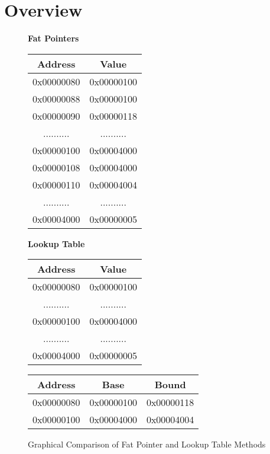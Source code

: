\section{Overview}

\begin{figure}[h]
    \begin{minipage}[t]{0.40\linewidth}
        \centering
        \textbf{Fat Pointers}
        \begin{tabular}{|c|c|}
            \hline \textbf{Address} & \textbf{Value} \\
            \hline 0x00000080 & 0x00000100 \\
            \hline 0x00000088 & 0x00000100 \\
            \hline 0x00000090 & 0x00000118 \\
            \hline .......... & .......... \\
            \hline 0x00000100 & 0x00004000 \\
            \hline 0x00000108 & 0x00004000 \\
            \hline 0x00000110 & 0x00004004 \\
            \hline .......... & .......... \\
            \hline 0x00004000 & 0x00000005 \\
            \hline
        \end{tabular}
    \end{minipage}
    \hspace{0.2cm}
    \begin{minipage}[t]{0.50\linewidth}
        \centering
        \textbf{Lookup Table}
        \begin{tabular}{|c|c|}
            \hline \textbf{Address} & \textbf{Value} \\
            \hline 0x00000080 & 0x00000100 \\
            \hline .......... & .......... \\
            \hline 0x00000100 & 0x00004000 \\
            \hline .......... & .......... \\
            \hline 0x00004000 & 0x00000005 \\
            \hline
        \end{tabular}
        \newline
        \vspace{0.2cm}
        \newline
        \begin{tabular}{|c|c|c|}
            \hline \textbf{Address} & \textbf{Base} & \textbf{Bound} \\
            \hline 0x00000080 & 0x00000100 & 0x00000118 \\
            \hline 0x00000100 & 0x00004000 & 0x00004004 \\
            \hline
        \end{tabular}
    \end{minipage}
    \caption{Graphical Comparison of Fat Pointer and Lookup Table Methods}
    \label{fig:FatPointerAndTable}
\end{figure}

